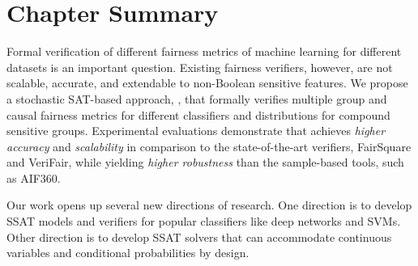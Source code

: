\section{Chapter Summary}
Formal verification of different fairness metrics of machine learning for different datasets is an important question. Existing fairness verifiers, however, are not scalable, accurate, and extendable to non-Boolean sensitive features. We propose a stochastic SAT-based approach, {\justicia}, that formally verifies multiple group and causal fairness metrics for different classifiers and distributions for compound sensitive groups.
Experimental evaluations demonstrate that {\justicia} achieves \textit{higher accuracy} and \textit{scalability} in comparison to the state-of-the-art verifiers, FairSquare and VeriFair, while yielding \textit{higher robustness} than the sample-based tools, such as AIF360.

Our work opens up several new directions of research. One direction is to develop SSAT models and verifiers for popular classifiers like deep networks and SVMs. Other direction is to develop SSAT solvers that can accommodate continuous variables and conditional probabilities by design. 

